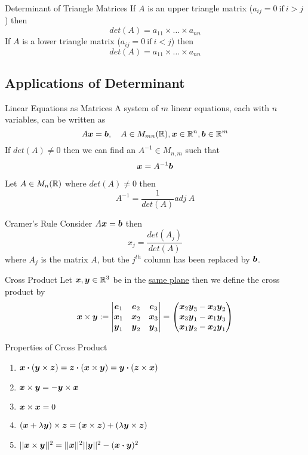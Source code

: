 \documentclass[11pt,a4paper]{article}
\begin{document}
\subtitle{Remark 6.11 - }{Determinant of Triangle Matrices}
If $A$ is an upper triangle matrix ($a_{ij} = 0 \mathrm{\ if\ } i > j$) then $$det(A) = a_{11} \times \dots \times a_{nn}$$
If $A$ is a lower triangle matrix ($a_{ij} = 0 \mathrm{\ if\ } i < j$) then $$det(A) = a_{11} \times \dots \times a_{nn}$$

\subsection{Applications of Determinant}

\subtitle{Theorem 6.12 - }{Linear Equations as Matrices}
A system of $m$ linear equations, each with $n$ variables, can be written as $$A\boldsymbol{x} = \boldsymbol{b},\quad A \in M_{mn}(\mathbb{R}), \boldsymbol{x} \in \mathbb{R}^n, \boldsymbol{b} \in \mathbb{R}^m$$
If $det(A) \not = 0$ then we can find an $A^{-1} \in M_{n,m}$ such that $$\boldsymbol{x} = A^{-1}\boldsymbol{b}$$

\subtitle{Theorem 6.13}{}
Let $A \in M_n(\mathbb{R})$ where $det(A) \not = 0$ then $$A^{-1} = \frac{1}{det(A)}adj\ A$$

\subtitle{Theorem 6.14 - }{Cramer's Rule}
Consider $A\boldsymbol{x} = \boldsymbol{b}$ then $$x_j = \frac{det(A_j)}{det(A)}$$ where $A_j$ is the matrix $A$, but the $j^{th}$ column has been replaced by $\boldsymbol{b}$. \\

\subtitle{Definition 6.15 - }{Cross Product}
Let $\boldsymbol{x}, \boldsymbol{y} \in \mathbb{R}^3$ be in the \underline{same plane} then we define the cross product by
$$\boldsymbol{x} \times \boldsymbol{y} := \begin{vmatrix}
  \boldsymbol{e}_1 & \boldsymbol{e}_2 & \boldsymbol{e}_3 \\
  \boldsymbol{x}_1 & \boldsymbol{x}_2 & \boldsymbol{x}_3 \\
  \boldsymbol{y}_1 & \boldsymbol{y}_2 & \boldsymbol{y}_3
\end{vmatrix} = \begin{pmatrix}
  \boldsymbol{x}_2\boldsymbol{y}_3 - \boldsymbol{x}_3\boldsymbol{y}_2 \\
  \boldsymbol{x}_3\boldsymbol{y}_1 - \boldsymbol{x}_1\boldsymbol{y}_3 \\
  \boldsymbol{x}_1\boldsymbol{y}_2 - \boldsymbol{x}_2\boldsymbol{y}_1
\end{pmatrix}$$

\subtitle{Theorem 6.16 - }{Properties of Cross Product}
\begin{enumerate}[label=\roman*)]
  \item $ \boldsymbol{x} \boldsymbol{\cdot} (\boldsymbol{y} \times \boldsymbol{z}) = \boldsymbol{z} \boldsymbol{\cdot} (\boldsymbol{x} \times \boldsymbol{y}) = \boldsymbol{y} \boldsymbol{\cdot} (\boldsymbol{z} \times \boldsymbol{x}) $
  \item $ \boldsymbol{x} \times \boldsymbol{y} = - \boldsymbol{y} \times \boldsymbol{x} $
  \item $ \boldsymbol{x} \times \boldsymbol{x} = 0 $
  \item $ (\boldsymbol{x} + \lambda\boldsymbol{y}) \times \boldsymbol{z} = (\boldsymbol{x} \times \boldsymbol{z}) + (\lambda\boldsymbol{y} \times \boldsymbol{z}) $
  \item $ ||\boldsymbol{x} \times \boldsymbol{y}||^2 = ||\boldsymbol{x}||^2||\boldsymbol{y}||^2 - (\boldsymbol{x} \boldsymbol{\cdot} \boldsymbol{y})^2$
\end{enumerate}
\end{document}
